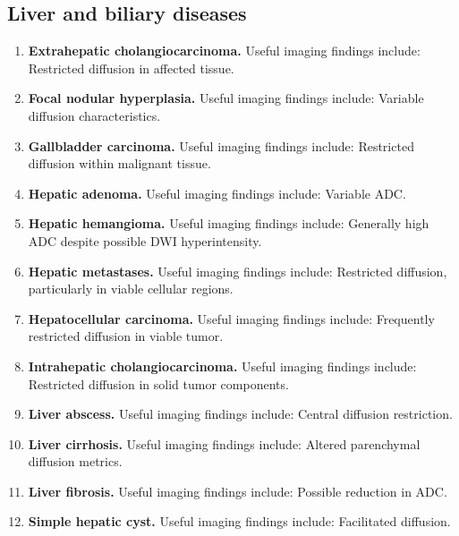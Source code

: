 \subsection{Liver and biliary diseases}
\begin{enumerate}[leftmargin=*,itemsep=0.45em,topsep=0.4em]
\item \textbf{Extrahepatic cholangiocarcinoma.} Useful imaging findings include: Restricted diffusion in affected tissue.
\item \textbf{Focal nodular hyperplasia.} Useful imaging findings include: Variable diffusion characteristics.
\item \textbf{Gallbladder carcinoma.} Useful imaging findings include: Restricted diffusion within malignant tissue.
\item \textbf{Hepatic adenoma.} Useful imaging findings include: Variable ADC.
\item \textbf{Hepatic hemangioma.} Useful imaging findings include: Generally high ADC despite possible DWI hyperintensity.
\item \textbf{Hepatic metastases.} Useful imaging findings include: Restricted diffusion, particularly in viable cellular regions.
\item \textbf{Hepatocellular carcinoma.} Useful imaging findings include: Frequently restricted diffusion in viable tumor.
\item \textbf{Intrahepatic cholangiocarcinoma.} Useful imaging findings include: Restricted diffusion in solid tumor components.
\item \textbf{Liver abscess.} Useful imaging findings include: Central diffusion restriction.
\item \textbf{Liver cirrhosis.} Useful imaging findings include: Altered parenchymal diffusion metrics.
\item \textbf{Liver fibrosis.} Useful imaging findings include: Possible reduction in ADC.
\item \textbf{Simple hepatic cyst.} Useful imaging findings include: Facilitated diffusion.
\end{enumerate}

